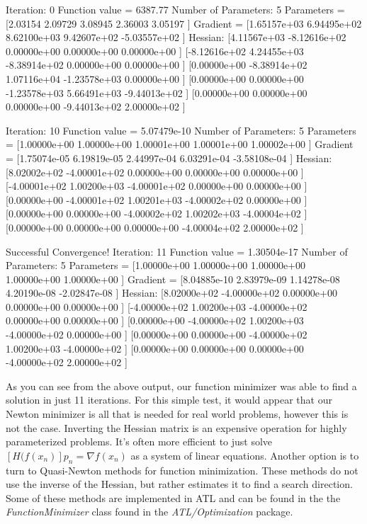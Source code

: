 \documentclass[12pt,a4paper]{article}
\begin{document}
 \begin{myoutput}
Iteration: 0
Function value = 6387.77
Number of Parameters: 5
Parameters = [2.03154 2.09729 3.08945 2.36003 3.05197 ]
Gradient = [1.65157e+03    6.94495e+02    8.62100e+03    9.42607e+02    -5.03557e+02   ]
Hessian:
[4.11567e+03    -8.12616e+02   0.00000e+00    0.00000e+00    0.00000e+00    ]
[-8.12616e+02   4.24455e+03    -8.38914e+02   0.00000e+00    0.00000e+00    ]
[0.00000e+00    -8.38914e+02   1.07116e+04    -1.23578e+03   0.00000e+00    ]
[0.00000e+00    0.00000e+00    -1.23578e+03   5.66491e+03    -9.44013e+02   ]
[0.00000e+00    0.00000e+00    0.00000e+00    -9.44013e+02   2.00000e+02    ]



Iteration: 10
Function value = 5.07479e-10
Number of Parameters: 5
Parameters = [1.00000e+00 1.00000e+00 1.00001e+00 1.00001e+00 1.00002e+00 ]
Gradient = [1.75074e-05    6.19819e-05    2.44997e-04    6.03291e-04    -3.58108e-04   ]
Hessian:
[8.02002e+02    -4.00001e+02   0.00000e+00    0.00000e+00    0.00000e+00    ]
[-4.00001e+02   1.00200e+03    -4.00001e+02   0.00000e+00    0.00000e+00    ]
[0.00000e+00    -4.00001e+02   1.00201e+03    -4.00002e+02   0.00000e+00    ]
[0.00000e+00    0.00000e+00    -4.00002e+02   1.00202e+03    -4.00004e+02   ]
[0.00000e+00    0.00000e+00    0.00000e+00    -4.00004e+02   2.00000e+02    ]



Successful Convergence!
Iteration: 11
Function value = 1.30504e-17
Number of Parameters: 5
Parameters = [1.00000e+00 1.00000e+00 1.00000e+00 1.00000e+00 1.00000e+00 ]
Gradient = [8.04885e-10    2.83979e-09    1.14278e-08    4.20190e-08    -2.02847e-08   ]
Hessian:
[8.02000e+02    -4.00000e+02   0.00000e+00    0.00000e+00    0.00000e+00    ]
[-4.00000e+02   1.00200e+03    -4.00000e+02   0.00000e+00    0.00000e+00    ]
[0.00000e+00    -4.00000e+02   1.00200e+03    -4.00000e+02   0.00000e+00    ]
[0.00000e+00    0.00000e+00    -4.00000e+02   1.00200e+03    -4.00000e+02   ]
[0.00000e+00    0.00000e+00    0.00000e+00    -4.00000e+02   2.00000e+02    ]
 \end{myoutput}
As you can see from the above output, our function minimizer was able to find a solution in just 11 iterations. For this simple test, it would appear that our Newton minimizer is all that is needed for real world problems, however this is not the case. Inverting the Hessian matrix is an expensive operation for highly parameterized problems. It's often more efficient to just solve $[H(f(x_n)]p_n = \nabla f(x_n)$ as a system of linear equations. Another option is to turn to Quasi-Newton methods for function minimization.  These methods do not use the inverse of the Hessian, but rather estimates it to find a search direction. Some of these methods are implemented in ATL and can be found in the the \textit{FunctionMinimizer} class found in the \textit{ATL/Optimization} package. 
\end{document}
